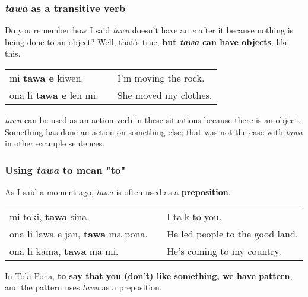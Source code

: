 \subsubsection*{\textit{tawa} as a transitive verb}
%
Do you remember how I said \textit{tawa} doesn't have an \textit{e} after it because nothing is being done to an object? 
Well, that's true, \textbf{but \textit{tawa} can have objects}, like this.

\begin{supertabular}{p{5,5cm}|ll}
mi \textbf{tawa e} kiwen. && I'm moving the rock. \\
ona li \textbf{tawa e} len mi. && She moved my clothes. \\
\end{supertabular} 

\textit{tawa} can be used as an action verb in these situations because there is an object. 
Something has done an action on something else; that was not the case with \textit{tawa} in other example sentences. 

%
\subsubsection*{Using \textit{tawa} to mean "to"}
%
As I said a moment ago, \textit{tawa} is often used as a \textbf{preposition}. 

\begin{supertabular}{p{5,5cm}|ll}
mi toki, \textbf{tawa} sina. && I talk to you. \\
ona li lawa e jan, \textbf{tawa} ma pona. && He led people to the good land. \\
ona li kama, \textbf{tawa} ma mi. && He's coming to my country. \\
\end{supertabular} 

In Toki Pona, \textbf{to say that you (don't) like something, we have pattern}, and the pattern uses \textit{tawa} as a preposition.

